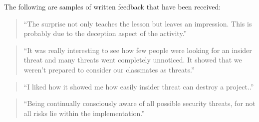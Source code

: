 \documentclass[conference]{IEEEtran}
\newcommand{\todo}[1]{\textcolor{cyan}{\textbf{[#1]}}}
\begin{document}











The following are samples of written feedback that have been received:

\begin{quotation}
``The surprise not only teaches the lesson but leaves an impression. This is probably due to the deception aspect of the activity.''
\end{quotation}

\begin{quotation}
``It was really interesting to see how few people were looking for an insider threat and many threats went completely unnoticed. It showed that we weren't prepared to consider our classmates as threats.''
\end{quotation}



\begin{quotation}
``I liked how it showed me how easily insider threat can destroy a project..''
\end{quotation}



\begin{quotation}
``Being continually consciously aware of all possible security threats, for not all risks lie within the implementation.''
\end{quotation}
\end{document}
